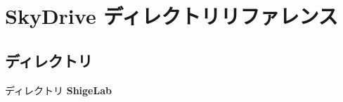 \section{Sky\-Drive ディレクトリリファレンス}
\label{dir_45aeffd6702719c5f3cbf0d005461816}
\subsection*{ディレクトリ}
\begin{DoxyCompactItemize}
\item 
ディレクトリ {\bf Shige\-Lab}
\end{DoxyCompactItemize}
